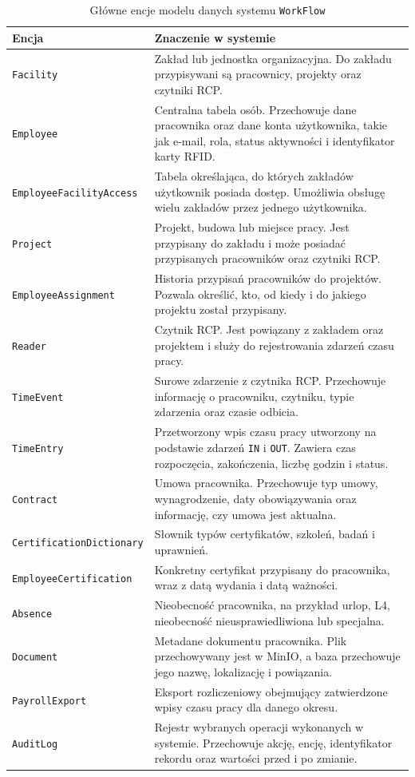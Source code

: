 \begin{table}[H]
\centering
\renewcommand{\arraystretch}{1.25}
\begin{tabular}{|p{}|p{}|}
\hline
\textbf{Encja} & \textbf{Znaczenie w systemie} \\ \hline
\texttt{Facility} & Zakład lub jednostka organizacyjna. Do zakładu przypisywani są pracownicy, projekty oraz czytniki RCP. \\ \hline
\texttt{Employee} & Centralna tabela osób. Przechowuje dane pracownika oraz dane konta użytkownika, takie jak e-mail, rola, status aktywności i identyfikator karty RFID. \\ \hline
\texttt{EmployeeFacilityAccess} & Tabela określająca, do których zakładów użytkownik posiada dostęp. Umożliwia obsługę wielu zakładów przez jednego użytkownika. \\ \hline
\texttt{Project} & Projekt, budowa lub miejsce pracy. Jest przypisany do zakładu i może posiadać przypisanych pracowników oraz czytniki RCP. \\ \hline
\texttt{EmployeeAssignment} & Historia przypisań pracowników do projektów. Pozwala określić, kto, od kiedy i do jakiego projektu został przypisany. \\ \hline
\texttt{Reader} & Czytnik RCP. Jest powiązany z zakładem oraz projektem i służy do rejestrowania zdarzeń czasu pracy. \\ \hline
\texttt{TimeEvent} & Surowe zdarzenie z czytnika RCP. Przechowuje informację o pracowniku, czytniku, typie zdarzenia oraz czasie odbicia. \\ \hline
\texttt{TimeEntry} & Przetworzony wpis czasu pracy utworzony na podstawie zdarzeń \texttt{IN} i \texttt{OUT}. Zawiera czas rozpoczęcia, zakończenia, liczbę godzin i status. \\ \hline
\texttt{Contract} & Umowa pracownika. Przechowuje typ umowy, wynagrodzenie, daty obowiązywania oraz informację, czy umowa jest aktualna. \\ \hline
\texttt{CertificationDictionary} & Słownik typów certyfikatów, szkoleń, badań i uprawnień. \\ \hline
\texttt{EmployeeCertification} & Konkretny certyfikat przypisany do pracownika, wraz z datą wydania i datą ważności. \\ \hline
\texttt{Absence} & Nieobecność pracownika, na przykład urlop, L4, nieobecność nieusprawiedliwiona lub specjalna. \\ \hline
\texttt{Document} & Metadane dokumentu pracownika. Plik przechowywany jest w MinIO, a baza przechowuje jego nazwę, lokalizację i powiązania. \\ \hline
\texttt{PayrollExport} & Eksport rozliczeniowy obejmujący zatwierdzone wpisy czasu pracy dla danego okresu. \\ \hline
\texttt{AuditLog} & Rejestr wybranych operacji wykonanych w systemie. Przechowuje akcję, encję, identyfikator rekordu oraz wartości przed i po zmianie. \\ \hline
\end{tabular}
\caption{Główne encje modelu danych systemu \texttt{WorkFlow}}
\label{tab:main_entities}
\end{table}


